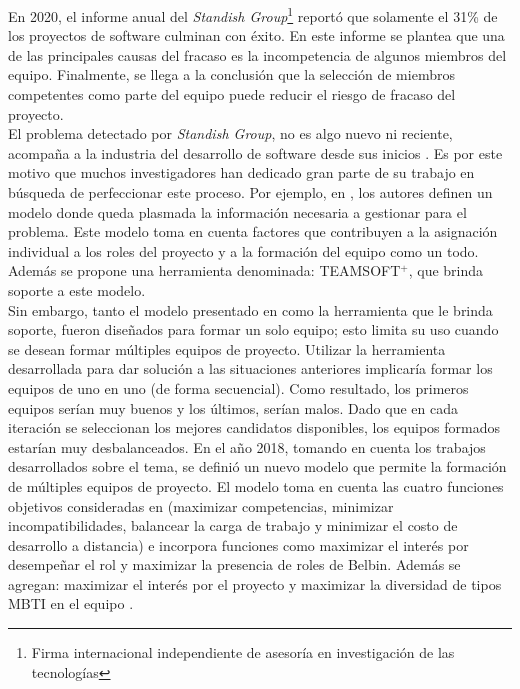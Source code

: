 En 2020, el informe anual del \textit{Standish Group}\footnote{Firma internacional independiente de asesoría en investigación de las tecnologías}\cite{Group2020} reportó que solamente el 31\% de los proyectos de software culminan con éxito. En este informe se plantea que una de las principales causas del fracaso es la incompetencia de algunos miembros del equipo. Finalmente, se llega a la conclusión que la selección de miembros competentes como parte del equipo puede reducir el riesgo de fracaso del proyecto.\\

El problema detectado por \textit{Standish Group}, no es algo nuevo ni reciente, acompaña a la industria del desarrollo de software desde sus inicios \cite{ElEmam2008}. Es por este motivo que muchos investigadores han dedicado gran parte de su trabajo en búsqueda de perfeccionar este proceso. Por ejemplo, en \cite{Mayi09}, los autores definen un modelo donde queda plasmada la información necesaria a gestionar para el problema. Este modelo toma en cuenta factores que contribuyen a la asignación individual a los roles del proyecto y a la formación del equipo como un todo. Además se propone una herramienta denominada: TEAMSOFT$^+$, que brinda soporte a este modelo.\\

Sin embargo, tanto el modelo presentado en \cite{Mayi09} como la herramienta que le brinda soporte, fueron diseñados para formar un solo equipo; esto limita su uso cuando se desean formar múltiples equipos de proyecto. Utilizar la herramienta desarrollada para dar solución a las situaciones anteriores implicaría formar los equipos de uno en uno (de forma secuencial). Como resultado, los primeros equipos serían muy buenos y los últimos, serían malos. Dado que en cada iteración se seleccionan los mejores candidatos disponibles, los equipos formados estarían muy  desbalanceados. En el año 2018, tomando en cuenta los trabajos desarrollados sobre el tema, se definió un nuevo modelo que permite la formación de múltiples equipos de proyecto. El modelo toma en cuenta las cuatro funciones objetivos consideradas en \cite{Mayi09} (maximizar competencias, minimizar incompatibilidades, balancear la carga de trabajo y minimizar el costo de desarrollo a distancia) e incorpora funciones como maximizar el interés por desempeñar el rol y maximizar la presencia de roles de Belbin. Además se agregan: maximizar el interés por el proyecto y maximizar la diversidad de tipos MBTI en el equipo \cite{Duran2019}.\\



